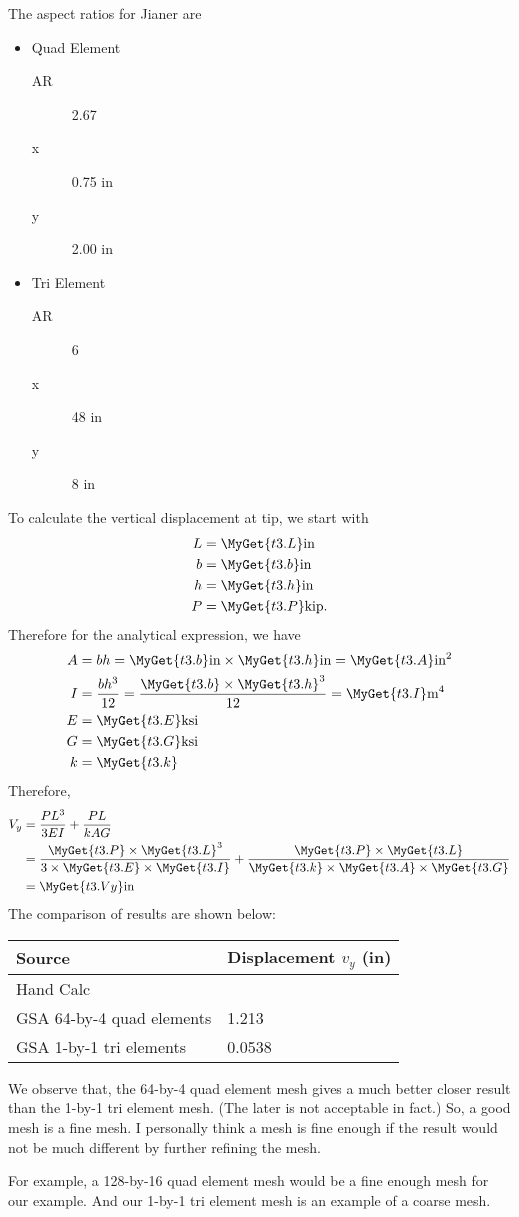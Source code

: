 The aspect ratios for Jianer are
\begin{itemize}
\item Quad Element
  \begin{description}
  \item[{AR}] 2.67
  \item[{x}] 0.75 in
  \item[{y}] 2.00 in
  \end{description}
\item Tri Element
  \begin{description}
  \item[{AR}] 6
  \item[{x}] 48 in
  \item[{y}] 8 in
  \end{description}
\end{itemize}
\def\g#1{\MyGet{t3.#1}}
To calculate the vertical displacement at tip, we start with
\def\i{\text{in}}
\begin{align*}
  L &= \g{L} \i\\
  b &= \g{b} \i\\
  h &= \g{h} \i\\
  P &= \g{P} \text{kip}.
\end{align*}
Therefore for the analytical expression, we have
\begin{align*}
  A &= bh = \g{b} \i \times \g{h} \i = \g{A} \i^2\\
  I &= \frac{bh^3}{12} = \frac{\g{b} \times \g{h}^3}{12} = \g{I} \text{m}^4 \\
  E &= \g{E} \text{ksi}\\
  G &= \g{G} \text{ksi}\\
  k &= \g{k}
\end{align*}
Therefore,
\begin{align*}
  V_y &= \frac{PL^3}{3EI} + \frac{PL}{kAG} \\
      &= \frac{\g{P} \times \g{L}^3}{3 \times \g{E} \times \g{I}} +
        \frac{\g{P} \times \g{L}}{\g{k} \times \g{A} \times \g{G}} \\
      &= \g{Vy} \i
\end{align*}
The comparison of results are shown below:
\begin{center}
  \begin{tabular}{ll}
    Source & Displacement \(v_y\) (in)\\
    \hline
    Hand Calc   & \g{Vy} \\
    GSA 64-by-4 quad elements & 1.213       \\
    GSA 1-by-1 tri elements   & 0.0538
  \end{tabular}
\end{center}
We observe that, the 64-by-4 quad element mesh gives a much better closer result
than the 1-by-1 tri element mesh. (The later is not acceptable in fact.) So, a
good mesh is a fine mesh. I personally think a mesh is fine enough if the result
would not be much different by further refining the mesh.

For example, a 128-by-16 quad element mesh would be a fine enough mesh for our
example. And our 1-by-1 tri element mesh is an example of a coarse mesh.
